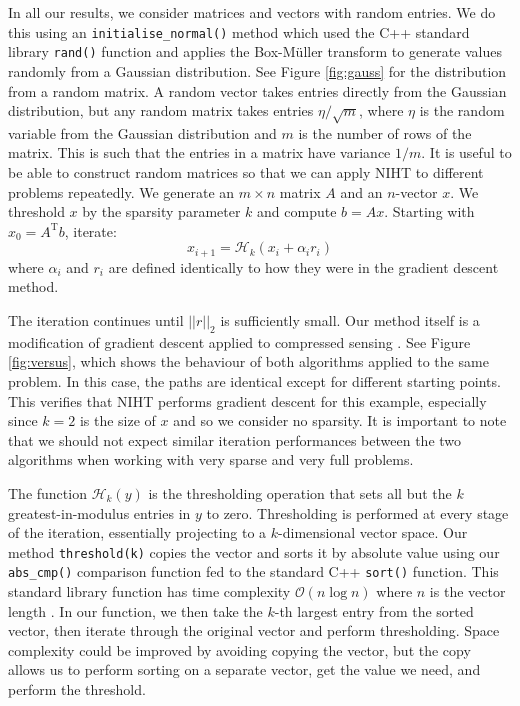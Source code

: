 \documentclass{article}
\begin{document}
In all our results, we consider matrices and vectors with random entries.
We do this using an \texttt{initialise\_normal()} method which used the C++ standard library \texttt{rand()} function and applies the Box-M{\"u}ller transform to generate values randomly from a Gaussian distribution.
See Figure \ref{fig:gauss} for the distribution from a random matrix.
A random vector takes entries directly from the Gaussian distribution,
but any random matrix takes entries $\eta/\sqrt{m}$, where $\eta$ is the random variable from the Gaussian distribution and $m$ is the number of rows of the matrix.
This is such that the entries in a matrix have variance $1/m$.
It is useful to be able to construct random matrices so that we can apply NIHT to different problems repeatedly.
We generate an $m \times n$ matrix $A$ and an $n$-vector $x$. We threshold $x$ by the sparsity parameter $k$ and compute $b=Ax$.
Starting with $x_0 = A^\mathrm{T}b$, iterate:
\begin{equation*}
    x_{i+1} = \mathcal{H}_k \left(
        x_i + \alpha_i r_i
    \right)
\end{equation*}
where $\alpha_i$ and $r_i$ are defined identically to how they were in the gradient descent method.

The iteration continues until $||r||_2$ is sufficiently small.
Our method itself is a modification of gradient descent applied to compressed sensing \cite{blanchard2013gpu}.
See Figure \ref{fig:versus}, which shows the behaviour of both algorithms applied to the same problem.
In this case, the paths are identical except for different starting points.
This verifies that NIHT performs gradient descent for this example, especially since $k=2$ is the size of $x$ and so we consider no sparsity.
It is important to note that we should not expect similar iteration performances between the two algorithms when working with very sparse and very full problems.


The function $\mathcal{H}_k(y)$ is the thresholding operation that sets all but the $k$ greatest-in-modulus entries in $y$ to zero.
Thresholding is performed at every stage of the iteration, essentially projecting to a $k$-dimensional vector space.
Our method \texttt{threshold(k)} copies the vector and sorts it by absolute value using our \texttt{abs\_cmp()} comparison function fed to the standard C++ \texttt{sort()} function.
This standard library function has time complexity $\mathcal{O}(n \log n)$ where $n$ is the vector length \cite{cppreference.com}.
In our function, we then take the $k$-th largest entry from the sorted vector, then iterate through the original vector and perform thresholding.
Space complexity could be improved by avoiding copying the vector, but the copy allows us to perform sorting on a separate vector, get the value we need, and perform the threshold.
\end{document}
